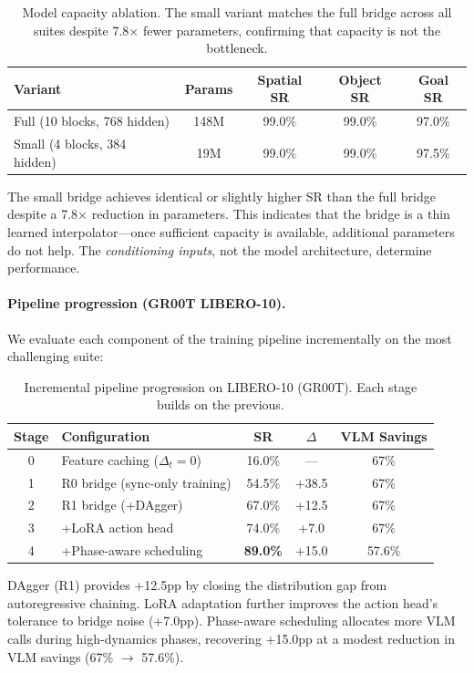 \documentclass{article}
\begin{document}
\begin{table}[h]
\caption{Model capacity ablation. The small variant matches the full bridge across all suites despite 7.8$\times$ fewer parameters, confirming that capacity is not the bottleneck.}
\label{tab:ablation_capacity}
\centering
\small
\begin{tabular}{l|c|ccc}
\toprule
Variant & Params & Spatial SR & Object SR & Goal SR \\
\midrule
Full (10 blocks, 768 hidden)  & 148M & 99.0\% & 99.0\% & 97.0\% \\
Small (4 blocks, 384 hidden)  & 19M  & 99.0\% & 99.0\% & 97.5\% \\
\bottomrule
\end{tabular}
\end{table}

The small bridge achieves identical or slightly higher SR than the full bridge despite a 7.8$\times$ reduction in parameters.
This indicates that the bridge is a thin learned interpolator---once sufficient capacity is available, additional parameters do not help.
The \emph{conditioning inputs}, not the model architecture, determine performance.

\paragraph{Pipeline progression (GR00T LIBERO-10).}
We evaluate each component of the training pipeline incrementally on the most challenging suite:

\begin{table}[h]
\caption{Incremental pipeline progression on LIBERO-10 (GR00T). Each stage builds on the previous.}
\label{tab:progression}
\centering
\small
\begin{tabular}{clccc}
\toprule
Stage & Configuration & SR & $\Delta$ & VLM Savings \\
\midrule
0 & Feature caching ($\Delta_t{=}0$) & 16.0\% & --- & 67\% \\
1 & R0 bridge (sync-only training) & 54.5\% & +38.5 & 67\% \\
2 & R1 bridge (+DAgger) & 67.0\% & +12.5 & 67\% \\
3 & +LoRA action head & 74.0\% & +7.0 & 67\% \\
4 & +Phase-aware scheduling & \textbf{89.0\%} & +15.0 & 57.6\% \\
\bottomrule
\end{tabular}
\end{table}

DAgger (R1) provides +12.5pp by closing the distribution gap from autoregressive chaining.
LoRA adaptation further improves the action head's tolerance to bridge noise (+7.0pp).
Phase-aware scheduling allocates more VLM calls during high-dynamics phases, recovering +15.0pp at a modest reduction in VLM savings (67\% $\to$ 57.6\%).
\end{document}
